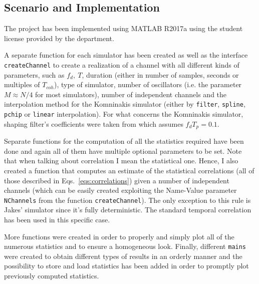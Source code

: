\subsection{Scenario and Implementation} %
\label{subsec:scenario}

The project has been implemented using MATLAB\textsuperscript{\textregistered} R2017a using the student license provided by the department.

A separate function for each simulator has been created as well as the interface \texttt{createChannel} to create a realization of a channel with all different kinds of parameters, such as $f_d,\ T$, duration (either in number of samples, seconds or multiples of $T_{coh}$), type of simulator, number of oscillators (i.e. the parameter $M \approx N/4$ for most simulators), number of independent channels and the interpolation method for the Komninakis simulator (either by \texttt{filter}, \texttt{spline}, \texttt{pchip} or \texttt{linear} interpolation). For what concerns the Komninakis simulator, shaping filter's coefficients were taken from \cite[p.~317]{digital} which assumes $f_dT_p=0.1$.

Separate functions for the computation of all the statistics required have been done and again all of them have multiple optional parameters to be set. Note that when talking about correlation I mean the statistical one. Hence, I also created a function that computes an estimate of the statistical correlations (all of those described in Eqs.~\ref{eqs:correlations}) given a number of independent channels (which can be easily created exploiting the Name-Value parameter \texttt{NChannels} from the function \texttt{createChannel}). The only exception to this rule is Jakes' simulator since it's fully deterministic. The standard temporal correlation has been used in this specific case.

More functions were created in order to properly and simply plot all of the numerous statistics and to ensure a homogeneous look. Finally, different \texttt{mains} were created to obtain different types of results in an orderly manner and the possibility to store and load statistics has been added in order to promptly plot previously computed statistics.